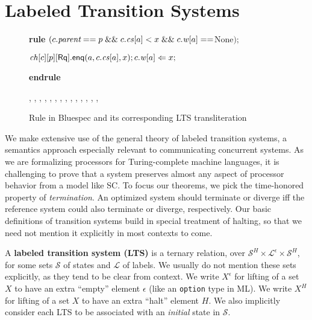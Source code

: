 \section{Labeled Transition Systems}\label{sec:lts}

\begin{figure*}
\centering
\begin{boxedminipage}{.53\textwidth}
\noindent \textbf{rule} $(c.\textit{parent} == p \; \mathit{\&\&} \; c.\mathit{cs}[a] < x \; \mathit{\&\&} \; c.\mathit{w}[a]==$None$);$

\hspace{1cm} $\mathit{ch}[c][p][\mathsf{Rq}].\mathsf{enq}(a,c.\mathit{cs}[a],x); c.\mathit{w}[a] \Leftarrow x;$

\textbf{endrule}
\end{boxedminipage}
\begin{boxedminipage}{\textwidth}
\small
{}
{
{\dt, \ch, \s, \dst, \wt, \dwt, \inp, \outp}
{\dt, , \s, \dst,
\wt[(c,a)\coloneqq x], \dwt, \inp, \outp}{}}
\end{boxedminipage}
\caption{Rule in Bluespec and its corresponding LTS transliteration}
\label{both}
\end{figure*}

We make extensive use of the general theory of labeled transition
systems, a semantics approach especially relevant to communicating
concurrent systems.  As we are formalizing processors for
Turing-complete machine languages, it is challenging to prove that a
system preserves almost any aspect of processor behavior from a model
like SC.  To focus our theorems, we pick the time-honored property of
\emph{termination}.  An optimized system should terminate or diverge
iff the reference system could also terminate or diverge,
respectively.  Our basic definitions of transition systems build in
special treatment of halting, so that we need not mention it
explicitly in most contexts to come.

\begin{defn}
A \textbf{labeled transition system (LTS)} is a ternary relation, over
$\mathcal S^H \times \mathcal L^\epsilon \times \mathcal S^H$, for some sets
$\mathcal S$ of states and $\mathcal L$ of labels. We usually do not mention
these sets explicitly, as they tend to be clear from context. We write
$X^\epsilon$ for lifting of a set $X$ to have an extra ``empty'' element
$\epsilon$ (like an \texttt{option} type in ML). We write $X^H$ for lifting of
a set $X$ to have an extra ``halt'' element $H$. We also implicitly consider
each LTS to be associated with an \emph{initial} state in $\mathcal S$.
\end{defn}

